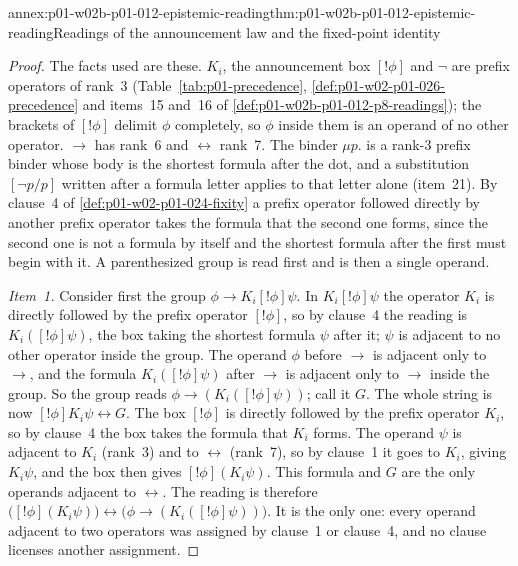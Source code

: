 \begin{annexitem}{annex:p01-w02b-p01-012-epistemic-reading}{thm:p01-w02b-p01-012-epistemic-reading}{Readings of the announcement law and the fixed-point identity}
\begin{proof}
The facts used are these.  \(K_i\), the announcement box \([!\phi]\) and
\(\neg\) are prefix operators of rank~3 (Table~\ref{tab:p01-precedence},
\cref{def:p01-w02-p01-026-precedence} and items~15 and~16 of
\cref{def:p01-w02b-p01-012-p8-readings}); the
brackets of \([!\phi]\) delimit \(\phi\) completely, so \(\phi\) inside
them is an operand of no other operator.  \(\to\) has rank~6 and
\(\leftrightarrow\) rank~7.  The binder \(\mu p.\) is a rank-3 prefix
binder whose body is the shortest formula after the dot, and a
substitution \([\neg p/p]\) written after a formula letter applies to that
letter alone (item~21).  By clause~4 of \cref{def:p01-w02-p01-024-fixity}
a prefix operator followed directly by another prefix operator takes the
formula that the second one forms, since the second one is not a formula
by itself and the shortest formula after the first must begin with it.
A parenthesized group is read first and is then a single operand.

\emph{Item~1.}  Consider first the group \(\phi\to K_i[!\phi]\psi\).  In
\(K_i[!\phi]\psi\) the operator \(K_i\) is directly followed by the prefix
operator \([!\phi]\), so by clause~4 the reading is
\(K_i([!\phi]\psi)\), the box taking the shortest formula \(\psi\) after
it; \(\psi\) is adjacent to no other operator inside the group.  The
operand \(\phi\) before \(\to\) is adjacent only to \(\to\), and the
formula \(K_i([!\phi]\psi)\) after \(\to\) is adjacent only to \(\to\)
inside the group.  So the group reads \(\phi\to(K_i([!\phi]\psi))\); call
it \(G\).  The whole string is now \([!\phi]K_i\psi\leftrightarrow G\).
The box \([!\phi]\) is directly followed by the prefix operator \(K_i\),
so by clause~4 the box takes the formula that \(K_i\) forms.  The operand
\(\psi\) is adjacent to \(K_i\) (rank~3) and to \(\leftrightarrow\)
(rank~7), so by clause~1 it goes to \(K_i\), giving \(K_i\psi\), and the
box then gives \([!\phi](K_i\psi)\).  This formula and \(G\) are the only
operands adjacent to \(\leftrightarrow\).  The reading is therefore
\(\bigl([!\phi](K_i\psi)\bigr)\leftrightarrow\bigl(\phi\to(K_i([!\phi]\psi))\bigr)\).
It is the only one: every operand adjacent to two operators was assigned
by clause~1 or clause~4, and no clause licenses another assignment.


\end{proof}
\end{annexitem}
